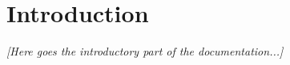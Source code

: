 %
%
%
%


\section{Introduction}
\textit{[Here goes the introductory part of the documentation...]}


